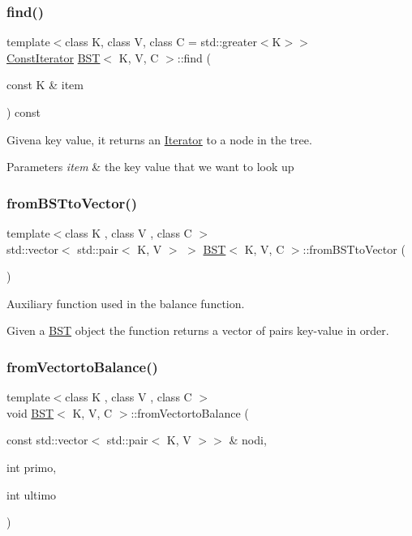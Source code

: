 \subsubsection{\texorpdfstring{find()}{find()}}
{\footnotesize\ttfamily template$<$class K, class V, class C = std\+::greater$<$\+K$>$$>$ \\
\hyperlink{classBST_1_1ConstIterator}{Const\+Iterator} \hyperlink{classBST}{B\+ST}$<$ K, V, C $>$\+::find (\begin{DoxyParamCaption}\item[{const K \&}]{item }\end{DoxyParamCaption}) const}



Givena key value, it returns an \hyperlink{classBST_1_1Iterator}{Iterator} to a node in the tree. 


\begin{DoxyParams}{Parameters}
{\em item} & the key value that we want to look up \\
\hline
\end{DoxyParams}
\mbox{\label{classBST_a1f96234b9a71bdb4c2edd88b0ef80743}} 
\subsubsection{\texorpdfstring{from\+B\+S\+Tto\+Vector()}{fromBSTtoVector()}}
{\footnotesize\ttfamily template$<$class K , class V , class C $>$ \\
std\+::vector$<$ std\+::pair$<$ K, V $>$ $>$ \hyperlink{classBST}{B\+ST}$<$ K, V, C $>$\+::from\+B\+S\+Tto\+Vector (\begin{DoxyParamCaption}{ }\end{DoxyParamCaption})}



Auxiliary function used in the balance function. 

Given a \hyperlink{classBST}{B\+ST} object the function returns a vector of pairs key-\/value in order. \mbox{\label{classBST_abdb2fbf5e98852e77cf2d576d6944795}} 
\subsubsection{\texorpdfstring{from\+Vectorto\+Balance()}{fromVectortoBalance()}}
{\footnotesize\ttfamily template$<$class K , class V , class C $>$ \\
void \hyperlink{classBST}{B\+ST}$<$ K, V, C $>$\+::from\+Vectorto\+Balance (\begin{DoxyParamCaption}\item[{const std\+::vector$<$ std\+::pair$<$ K, V $>$$>$ \&}]{nodi,  }\item[{int}]{primo,  }\item[{int}]{ultimo }\end{DoxyParamCaption})}



